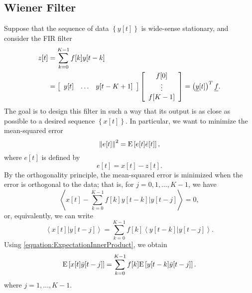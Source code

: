 \subsection{Wiener Filter}

Suppose that the sequence of data $\left\{ y[t] \right\}$ is wide-sense stationary, and consider the FIR filter
\begin{equation*}
\begin{split}
z[t] &= \sum_{k=0}^{K-1} f[k] y[t - k] \\
&= \left[ \begin{array}{ccc} y[t] & \hdots & y[t-K+1] \end{array} \right]
\left[ \begin{array}{c} f[0] \\ \vdots \\ f[K-1] \end{array} \right]
= \left( \underline{y}[t] \right)^T \underline{f} .
\end{split}
\end{equation*}
The goal is to design this filter in such a way that its output is as close as possible to a desired sequence $\left\{ x[t] \right\}$.
In particular, we want to minimize the mean-squared error
\begin{equation*}
\left\| e[t] \right\|^2 = \mathrm{E} \left[ e[t] \bar{e}[t] \right],
\end{equation*}
where $e[t]$ is defined by
\begin{equation*}
e[t] = x[t] - z[t].
\end{equation*}
By the orthogonality principle, the mean-squared error is minimized when the error is orthogonal to the data; that is, for $j = 0, 1, \ldots, K-1$, we have
\begin{equation*}
\left\langle x[t] - \sum_{k=0}^{K-1} f[k] y[t - k] \Big| y[t - j] \right\rangle = 0,
\end{equation*}
or, equivalently, we can write
\begin{equation*}
\left\langle x[t] | y[t - j] \right\rangle
= \sum_{k=0}^{K-1} f[k] \left\langle y[t - k] | y[t - j] \right\rangle .
\end{equation*}
Using \eqref{equation:ExpectationInnerProduct}, we obtain
\begin{equation} \label{equation:WienerHopfConditions}
\mathrm{E} \left[ x[t] \bar{y}[t - j] \right]
= \sum_{k=0}^{K-1} f[k] \mathrm{E} \left[ y[t - k] \bar{y}[t - j] \right] .
\end{equation}
where $j = 1, \ldots, K-1$.

